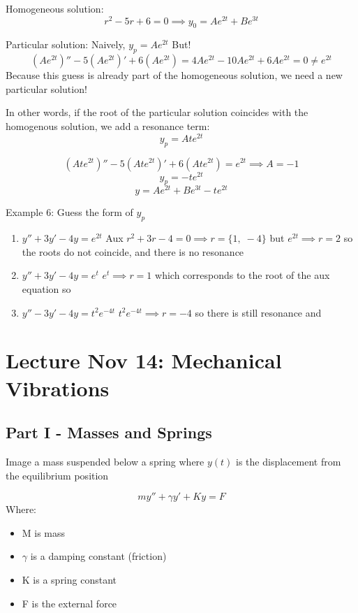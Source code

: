 \documentclass[12pt]{article}
\begin{document}
Homogeneous solution:
\[r^2 - 5r + 6 = 0 \implies y_0 = Ae^{2t} + Be^{3t} \]

Particular solution:
Naively, $y_p = Ae^{2t}$
But!
\[(Ae^{2t})'' - 5(Ae^{2t})' + 6(Ae^{2t}) = 4Ae^{2t} - 10Ae^{2t} + 6Ae^{2t} = 0 \neq e^{2t}\]
Because this guess is already part of the homogeneous solution, we need a new particular solution!

In other words, if the root of the particular solution coincides with the homogenous solution, we add a resonance term:
\[y_p = Ate^{2t}\]

\[(Ate^{2t})'' - 5(Ate^{2t})' + 6(Ate^{2t}) = e^{2t} \implies A = -1\]
\[y_p = -te^{2t}\]
\[\boxed{y = Ae^{2t} + Be^{3t} - te^{2t}}\]

Example 6: Guess the form of $y_p$
\begin{enumerate}
    \item $y'' + 3y' - 4y = e^{2t}$
    Aux $r^2 + 3r - 4 = 0 \implies r = \{1, \; -4\}$ but $e^{2t} \implies r = 2$ so the roots do not coincide, and there is no resonance
    \item $y'' + 3y' - 4y = e^{t}$
    $e^{t} \implies r = 1$ which corresponds to the root of the aux equation so 
    \item $y'' - 3y' -4y = t^2 e^{-4t}$
    $t^2 e^{-4t} \implies r = -4$ so there is still resonance and 
\end{enumerate}

\section{Lecture Nov 14: Mechanical Vibrations}
\subsection*{Part I - Masses and Springs}
Image a mass suspended below a spring where $y(t)$ is the displacement from the equilibrium position

\[my'' + \gamma y' + Ky = F\]
Where:
\begin{itemize}
    \item M is mass
    \item $\gamma$ is a damping constant (friction)
    \item K is a spring constant 
    \item F is the external force
\end{itemize}
\end{document}
